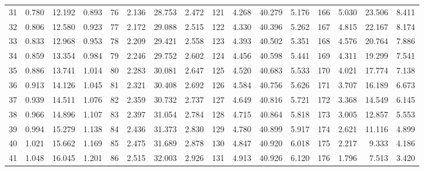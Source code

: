 \begin{table}[!h]
{\begin{tabular}{rrrr|rrrr|rrrr|rrrr}
 31 & \tiny{  0.780} &  12.192 & \tiny{  0.893} &  76 & \tiny{  2.136} &  28.753 & \tiny{  2.472} & 121 & \tiny{  4.268} &  40.279 & \tiny{  5.176} & 166 & \tiny{  5.030} &  23.506 & \tiny{  8.411}\\
 32 & \tiny{  0.806} &  12.580 & \tiny{  0.923} &  77 & \tiny{  2.172} &  29.088 & \tiny{  2.515} & 122 & \tiny{  4.330} &  40.396 & \tiny{  5.262} & 167 & \tiny{  4.815} &  22.167 & \tiny{  8.174}\\
 33 & \tiny{  0.833} &  12.968 & \tiny{  0.953} &  78 & \tiny{  2.209} &  29.421 & \tiny{  2.558} & 123 & \tiny{  4.393} &  40.502 & \tiny{  5.351} & 168 & \tiny{  4.576} &  20.764 & \tiny{  7.886}\\
 34 & \tiny{  0.859} &  13.354 & \tiny{  0.984} &  79 & \tiny{  2.246} &  29.752 & \tiny{  2.602} & 124 & \tiny{  4.456} &  40.598 & \tiny{  5.441} & 169 & \tiny{  4.311} &  19.299 & \tiny{  7.541}\\
 35 & \tiny{  0.886} &  13.741 & \tiny{  1.014} &  80 & \tiny{  2.283} &  30.081 & \tiny{  2.647} & 125 & \tiny{  4.520} &  40.683 & \tiny{  5.533} & 170 & \tiny{  4.021} &  17.774 & \tiny{  7.138}\\
 36 & \tiny{  0.913} &  14.126 & \tiny{  1.045} &  81 & \tiny{  2.321} &  30.408 & \tiny{  2.692} & 126 & \tiny{  4.584} &  40.756 & \tiny{  5.626} & 171 & \tiny{  3.707} &  16.189 & \tiny{  6.673}\\
 37 & \tiny{  0.939} &  14.511 & \tiny{  1.076} &  82 & \tiny{  2.359} &  30.732 & \tiny{  2.737} & 127 & \tiny{  4.649} &  40.816 & \tiny{  5.721} & 172 & \tiny{  3.368} &  14.549 & \tiny{  6.145}\\
 38 & \tiny{  0.966} &  14.896 & \tiny{  1.107} &  83 & \tiny{  2.397} &  31.054 & \tiny{  2.784} & 128 & \tiny{  4.715} &  40.864 & \tiny{  5.818} & 173 & \tiny{  3.005} &  12.857 & \tiny{  5.553}\\
 39 & \tiny{  0.994} &  15.279 & \tiny{  1.138} &  84 & \tiny{  2.436} &  31.373 & \tiny{  2.830} & 129 & \tiny{  4.780} &  40.899 & \tiny{  5.917} & 174 & \tiny{  2.621} &  11.116 & \tiny{  4.899}\\
 40 & \tiny{  1.021} &  15.662 & \tiny{  1.169} &  85 & \tiny{  2.475} &  31.689 & \tiny{  2.878} & 130 & \tiny{  4.847} &  40.920 & \tiny{  6.018} & 175 & \tiny{  2.217} &   9.333 & \tiny{  4.186}\\
 41 & \tiny{  1.048} &  16.045 & \tiny{  1.201} &  86 & \tiny{  2.515} &  32.003 & \tiny{  2.926} & 131 & \tiny{  4.913} &  40.926 & \tiny{  6.120} & 176 & \tiny{  1.796} &   7.513 & \tiny{  3.420}\\

\end{tabular}}
\end{table}
